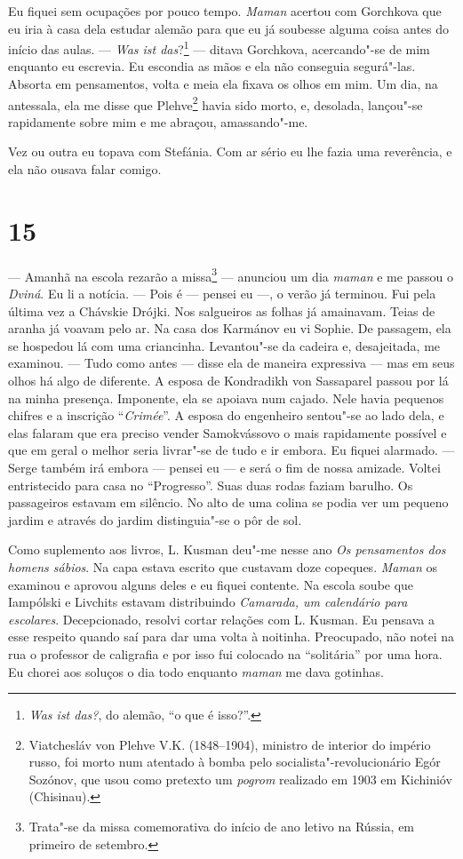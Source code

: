 Eu fiquei sem ocupações por pouco tempo. \emph{Maman} acertou com
Gorchkova que eu iria à casa dela estudar alemão para que eu já soubesse
alguma coisa antes do início das aulas. --- \emph{Was ist
das}?\footnote{\emph{Was ist das?}, do alemão, ``o que é isso?''.} ---
ditava Gorchkova, acercando"-se de mim enquanto eu escrevia. Eu escondia
as mãos e ela não conseguia segurá"-las. Absorta em pensamentos, volta e
meia ela fixava os olhos em mim. Um dia, na antessala, ela me disse que
Plehve\footnote{Viatchesláv von Plehve V.K. (1848--1904), ministro de
  interior do império russo, foi morto num atentado à bomba pelo
  socialista"-revolucionário Egór Sozónov, que usou como pretexto um
  \emph{pogrom} realizado em 1903 em Kichinióv (Chisinau).} havia sido
morto, e, desolada, lançou"-se rapidamente sobre mim e me abraçou,
amassando"-me.

Vez ou outra eu topava com Stefánia. Com ar sério eu lhe fazia uma
reverência, e ela não ousava falar comigo.

\section{15}

--- Amanhã na escola rezarão a missa\footnote{Trata"-se da missa
  comemorativa do início de ano letivo na Rússia, em primeiro de
  setembro.} --- anunciou um dia \emph{maman} e me passou o
\emph{Dviná}. Eu li a notícia. --- Pois é --- pensei eu ---, o verão já
terminou. Fui pela última vez a Chávskie Drójki. Nos salgueiros as
folhas já amainavam. Teias de aranha já voavam pelo ar. Na casa dos
Karmánov eu vi Sophie. De passagem, ela se hospedou lá com uma
criancinha. Levantou"-se da cadeira e, desajeitada, me examinou. --- Tudo
como antes --- disse ela de maneira expressiva --- mas em seus olhos há
algo de diferente. A esposa de Kondradikh von Sassaparel passou por lá
na minha presença. Imponente, ela se apoiava num cajado. Nele havia
pequenos chifres e a inscrição ``\emph{Crimée}''. A esposa do engenheiro
sentou"-se ao lado dela, e elas falaram que era preciso vender
Samokvássovo o mais rapidamente possível e que em geral o melhor seria
livrar"-se de tudo e ir embora. Eu fiquei alarmado. --- Serge também irá
embora --- pensei eu --- e será o fim de nossa amizade. Voltei
entristecido para casa no ``Progresso''. Suas duas rodas faziam barulho.
Os passageiros estavam em silêncio. No alto de uma colina se podia ver
um pequeno jardim e através do jardim distinguia"-se o pôr de sol.

Como suplemento aos livros, L. Kusman deu"-me nesse ano \emph{Os
pensamentos dos homens sábios}. Na capa estava escrito que custavam doze
copeques. \emph{Maman} os examinou e aprovou alguns deles e eu fiquei
contente. Na escola soube que Iampólski e Livchits estavam distribuindo
\emph{Camarada, um calendário para escolares}. Decepcionado, resolvi
cortar relações com L. Kusman. Eu pensava a esse respeito quando saí
para dar uma volta à noitinha. Preocupado, não notei na rua o professor
de caligrafia e por isso fui colocado na ``solitária'' por uma hora. Eu
chorei aos soluços o dia todo enquanto \emph{maman} me dava gotinhas.


